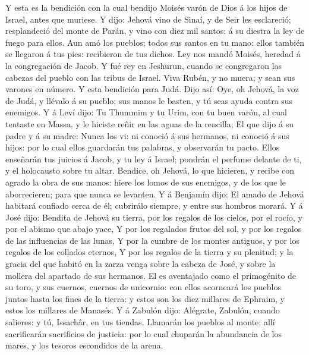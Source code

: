  Y esta es la bendición con la cual bendijo Moisés varón de
Dios á los hijos de Israel, antes que muriese.  Y dijo:
Jehová vino de Sinaí, y de Seir les esclareció; resplandeció del monte
de Parán, y vino con diez mil santos: á su diestra la ley de fuego para
ellos.  Aun amó los pueblos; todos sus santos en tu mano:
ellos también se llegaron á tus pies: recibieron de tus dichos.
 Ley nos mandó Moisés, heredad á la congregación de Jacob.
 Y fué rey en Jeshurun, cuando se congregaron las cabezas
del pueblo con las tribus de Israel.  Viva Rubén, y no
muera; y sean sus varones en número.  Y esta bendición para
Judá. Dijo así: Oye, oh Jehová, la voz de Judá, y llévalo á su pueblo;
sus manos le basten, y tú seas ayuda contra sus enemigos.  Y
á Leví dijo: Tu Thummim y tu Urim, con tu buen varón, al cual tentaste
en Massa, y le hiciste reñir en las aguas de la rencilla; 
El que dijo á su padre y á su madre: Nunca los vi: ni conoció á sus
hermanos, ni conoció á sus hijos: por lo cual ellos guardarán tus
palabras, y observarán tu pacto.  Ellos enseñarán tus
juicios á Jacob, y tu ley á Israel; pondrán el perfume delante de ti, y
el holocausto sobre tu altar.  Bendice, oh Jehová, lo que
hicieren, y recibe con agrado la obra de sus manos: hiere los lomos de
sus enemigos, y de los que le aborrecieren; para que nunca se levanten.
 Y á Benjamín dijo: El amado de Jehová habitará confiado
cerca de él; cubrirálo siempre, y entre sus hombros morará.
 Y á José dijo: Bendita de Jehová su tierra, por los
regalos de los cielos, por el rocío, y por el abismo que abajo yace,
 Y por los regalados frutos del sol, y por los regalos de
las influencias de las lunas,  Y por la cumbre de los
montes antiguos, y por los regalos de los collados eternos,
 Y por los regalos de la tierra y su plenitud; y la gracia
del que habitó en la zarza venga sobre la cabeza de José, y sobre la
mollera del apartado de sus hermanos.  El es aventajado
como el primogénito de su toro, y sus cuernos, cuernos de unicornio: con
ellos acorneará los pueblos juntos hasta los fines de la tierra: y estos
son los diez millares de Ephraim, y estos los millares de Manasés.
 Y á Zabulón dijo: Alégrate, Zabulón, cuando salieres: y
tú, Issachâr, en tus tiendas.  Llamarán los pueblos al
monte; allí sacrificarán sacrificios de justicia: por lo cual chuparán
la abundancia de los mares, y los tesoros escondidos de la arena.
